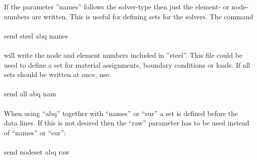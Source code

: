 \documentclass{article}
\begin{document}
If the parameter ''names'' follows the solver-type then just the element- or node-numbers are written. This is useful for defining sets for the solvers. The command\\\\send steel abq names\\\\will write the node and element numbers included in ''steel''. This file could be used to define a set for material assignments, boundary conditions or loads. If all sets should be written at once, use:\\\\send all abq nam\\\\When using ``abq'' together with ``names'' or ``sur'' a set is defined before the data lines. If this is not desired then the ``raw'' parameter has to be used instead of ``names'' or ``sur'':
\\\\send nodeset abq raw\\
\end{document}
